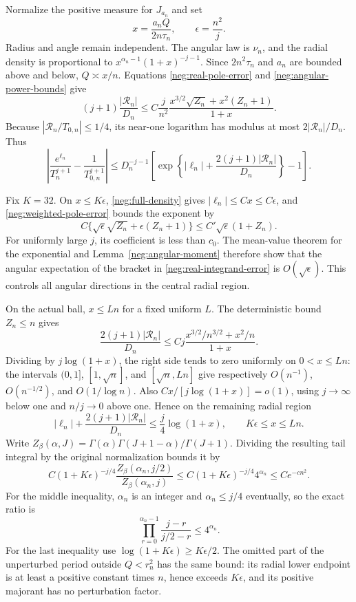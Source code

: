 \documentclass[11pt]{article}
\numberwithin{equation}{section}
\theoremstyle{definition}
\begin{document}
Normalize the positive measure for \(J_{a_n}\) and set
\[
 x=\frac{a_nQ}{2n\tau_n},\qquad \epsilon=\frac{n^2}{j}.
\]
Radius and angle remain independent.  The angular law is \(\nu_n\),
and the radial density is proportional to
\(x^{\alpha_n-1}(1+x)^{-j-1}\).  Since
\(2n^2\tau_n\) and \(a_n\) are bounded above and below,
\(Q\asymp x/n\).  Equations \eqref{neg:real-pole-error} and
\eqref{neg:angular-power-bounds} give
\begin{equation}
 (j+1)\frac{|\mathcal R_n|}{D_n}
 \le C\frac j{n^2}
   \frac{x^{3/2}\sqrt{Z_n}+x^2(Z_n+1)}{1+x}.
 \label{neg:weighted-pole-error}
\end{equation}
Because \(|\mathcal R_n/T_{0,n}|\le1/4\), its near-one
logarithm has modulus at most \(2|\mathcal R_n|/D_n\).  Thus
\begin{equation}
 \left|\frac{e^{\ell_n}}{T_n^{j+1}}-
                  \frac1{T_{0,n}^{j+1}}\right|
 \le D_n^{-j-1}\left[
    \exp\left\{|\ell_n|+
           \frac{2(j+1)|\mathcal R_n|}{D_n}\right\}-1\right].
 \label{neg:real-integrand-error}
\end{equation}

Fix \(K=32\).  On \(x\le K\epsilon\),
\eqref{neg:full-density} gives \(|\ell_n|\le Cx\le C\epsilon\),
and \eqref{neg:weighted-pole-error} bounds the exponent by
\[
 C\{\sqrt\epsilon\sqrt{Z_n}+\epsilon(Z_n+1)\}
       \le C'\sqrt\epsilon(1+Z_n).
\]
For uniformly large \(j\), its coefficient is less than \(c_0\).
The mean-value theorem for the exponential and
Lemma~\ref{neg:angular-moment} therefore show that the angular
expectation of the bracket in \eqref{neg:real-integrand-error}
is \(O(\sqrt\epsilon)\).  This controls all angular directions
in the central radial region.

On the actual ball, \(x\le Ln\) for a fixed uniform \(L\).
The deterministic bound \(Z_n\le n\) gives
\[
 \frac{2(j+1)|\mathcal R_n|}{D_n}
 \le Cj\frac{x^{3/2}/n^{3/2}+x^2/n}{1+x}.
\]
Dividing by \(j\log(1+x)\), the right side tends to zero
uniformly on \(0<x\le Ln\): the intervals
\((0,1]\), \([1,\sqrt n]\), and \([\sqrt n,Ln]\) give
respectively \(O(n^{-1})\), \(O(n^{-1/2})\), and
\(O(1/\log n)\).  Also
\(Cx/[j\log(1+x)]=o(1)\), using \(j\to\infty\) below one
and \(n/j\to0\) above one.  Hence on the remaining radial region
\[
 |\ell_n|+\frac{2(j+1)|\mathcal R_n|}{D_n}
 \le\frac j4\log(1+x),\qquad K\epsilon\le x\le Ln.
\]
Write \(Z_\beta(\alpha,J)=\Gamma(\alpha)
\Gamma(J+1-\alpha)/\Gamma(J+1)\).  Dividing the resulting tail
integral by the original normalization bounds it by
\[
 C(1+K\epsilon)^{-j/4}
       \frac{Z_\beta(\alpha_n,j/2)}{Z_\beta(\alpha_n,j)}
 \le C(1+K\epsilon)^{-j/4}4^{\alpha_n}
 \le Ce^{-cn^2}.
\]
For the middle inequality, \(\alpha_n\) is an integer and
\(\alpha_n\le j/4\) eventually, so the exact ratio is
\[
 \prod_{r=0}^{\alpha_n-1}\frac{j-r}{j/2-r}\le4^{\alpha_n}.
\]
For the last inequality use
\(\log(1+K\epsilon)\ge K\epsilon/2\).  The omitted part of
the unperturbed period outside \(Q<r_n^2\) has the same bound:
its radial lower endpoint is at least a positive constant times
\(n\), hence exceeds \(K\epsilon\), and its positive majorant
has no perturbation factor.
\end{document}
